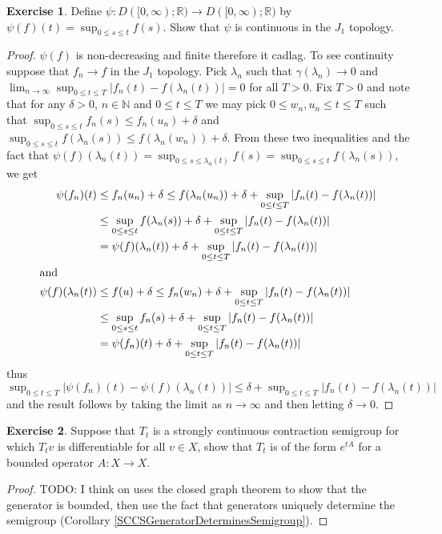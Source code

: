 \documentclass{amsbook}
\theoremstyle{definition}
\newtheorem{xca}{Exercise}
\theoremstyle{remark}
\newcommand{\reals}{\mathbb{R}}
\newcommand{\naturals}{\mathbb{N}}
\newcommand{\abs}[1]{\left \vert #1 \right \vert}
\begin{document}
\begin{xca}Define $\psi : D([0,\infty); \reals) \to D([0,\infty); \reals)$ by $\psi (f) (t) = \sup_{0 \leq s \leq t} f(s)$.  Show that $\psi$ is continuous in the $J_1$ topology.
\end{xca}
\begin{proof}
$\psi(f)$ is non-decreasing and finite therefore it cadlag.  To see continuity suppose that $f_n \to f$ in the $J_1$ topology.  Pick $\lambda_n$ such that $\gamma(\lambda_n) \to 0$
and $\lim_{n \to \infty} \sup_{0 \leq t \leq T} \abs{f_n(t) - f(\lambda_n(t))} =0$ for all $T > 0$.  Fix $T >0$ and note that
for any $\delta > 0$, $n \in \naturals$ and $0 \leq t \leq T$ we may pick $0 \leq w_n, u_n \leq t \leq T$ such that $\sup_{0 \leq s \leq t} f_n(s) \leq f_n(u_n) + \delta$ and 
$\sup_{0 \leq s \leq t} f(\lambda_n(s)) \leq f(\lambda_n(w_n)) + \delta$.  From these two inequalities and the fact that $\psi(f)(\lambda_n(t)) = \sup_{0 \leq s \leq \lambda_n(t)} f(s) = \sup_{0 \leq s \leq t} f(\lambda_n(s))$, we get
\begin{align*}
\psi(f_n)(t) &\leq f_n(u_n) + \delta \leq f(\lambda_n(u_n)) + \delta + \sup_{0 \leq t \leq T} \abs{f_n(t) - f(\lambda_n(t))}  \\
&\leq \sup_{0 \leq s \leq t} f(\lambda_n(s)) + \delta + \sup_{0 \leq t \leq T} \abs{f_n(t) - f(\lambda_n(t))}  \\
&= \psi(f)(\lambda_n(t)) + \delta + \sup_{0 \leq t \leq T} \abs{f_n(t) - f(\lambda_n(t))}  \\
\intertext{and}
\psi(f)(\lambda_n(t)) &\leq f(u) + \delta \leq f_n(w_n) + \delta + \sup_{0 \leq t \leq T} \abs{f_n(t) - f(\lambda_n(t))}  \\
&\leq \sup_{0 \leq s \leq t} f_n(s) + \delta + \sup_{0 \leq t \leq T} \abs{f_n(t) - f(\lambda_n(t))}  \\
&=\psi(f_n)(t) + \delta + \sup_{0 \leq t \leq T} \abs{f_n(t) - f(\lambda_n(t))} 
\end{align*}
thus $\sup_{0 \leq t \leq T} \abs{\psi(f_n)(t) - \psi(f)(\lambda_n(t))} \leq \delta + \sup_{0 \leq t \leq T} \abs{f_n(t) - f(\lambda_n(t))}$ and the result follows by taking the limit as $n \to \infty$ and then letting $\delta \to 0$.
\end{proof}

\begin{xca}Suppose that $T_t$ is a strongly continuous contraction semigroup for which $T_t v$ is differentiable for all $v \in X$, show that $T_t$ is of the form $e^{tA}$ for a bounded operator $A : X \to X$.
\end{xca}
\begin{proof}
TODO:  I think on uses the closed graph theorem to show that the generator is bounded, then use the fact that generators uniquely determine the semigroup (Corollary \ref{SCCSGeneratorDeterminesSemigroup}).
\end{proof}
\end{document}
